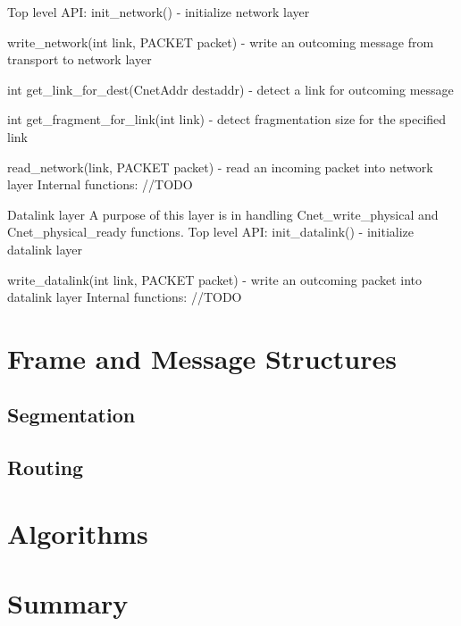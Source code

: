 \documentclass{article}
\begin{document}
		Top level API:
			init_network() - initialize network layer
		
			write_network(int link, PACKET packet) - write an outcoming message from
			transport to network layer
		
			int get_link_for_dest(CnetAddr destaddr) - detect a link for outcoming
			message
		
			int get_fragment_for_link(int link) - detect fragmentation size for the
			specified link
		
			read_network(link, PACKET packet) - read an incoming packet into network
			layer
		Internal functions:
			//TODO
		
		
	Datalink layer
		A purpose of this layer is in handling Cnet_write_physical and
		Cnet_physical_ready functions. 
		Top level API:
			init_datalink() - initialize datalink layer
		
			write_datalink(int link, PACKET packet) - write an outcoming packet into
			datalink layer
		Internal functions:
			//TODO



\section{Frame and Message Structures}

\subsection{Segmentation}

\subsection{Routing}

\section{Algorithms}

\section{Summary}
\end{document}
